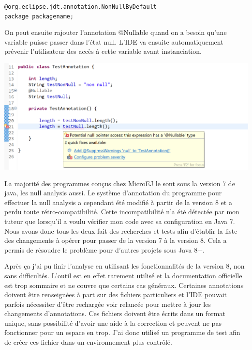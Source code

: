 \documentclass[french,a4paper,12pt]{report}
\begin{document}
\begin{lstlisting}
@org.eclipse.jdt.annotation.NonNullByDefault
package packagename;
\end{lstlisting}

On peut ensuite rajouter l'annotation @Nullable quand on a besoin qu'une variable puisse passer dans l'état null. L'IDE va ensuite automatiquement prévenir l'utilisateur des accès à cette variable avant instanciation.

\begin{center}
  \includegraphics[width=\textwidth]{ressources/images/nonnull.png}
\end{center}

La majorité des programmes conçus chez MicroEJ le sont sous la version 7 de java, les null analysis aussi. Le système d'annotation du programme pour effectuer la null analysis a cependant été modifié à partir de la version 8 et a perdu toute rétro-compatibilité. Cette incompatibilité n'a été détectée par mon tuteur que lorsqu'il a voulu vérifier mon code avec sa configuration en Java 7. Nous avons donc tous les deux fait des recherches et tests afin d'établir la liste des changements à opérer pour passer de la version 7 à la version 8. 
Cela a permis de résoudre le problème pour d'autres projets sous Java 8+.

Après ça j'ai pu finir l'analyse en utilisant les fonctionnalités de la version 8, non sans difficultés. L’outil est en effet rarement utilisé et la documentation officielle est trop sommaire et ne couvre que certains cas généraux. Certaines annotations doivent être renseignées à part sur des fichiers particuliers et l'IDE pouvait parfois nécessiter d'être rechargée voir relancée pour mettre à jour les changements d'annotations. Ces fichiers doivent être écrits dans un format unique, sans possibilité d'avoir une aide à la correction et peuvent ne pas fonctionner pour un espace en trop. J'ai donc utilisé un programme de test afin de créer ces fichier dans un environnement plus contrôlé.
\end{document}
